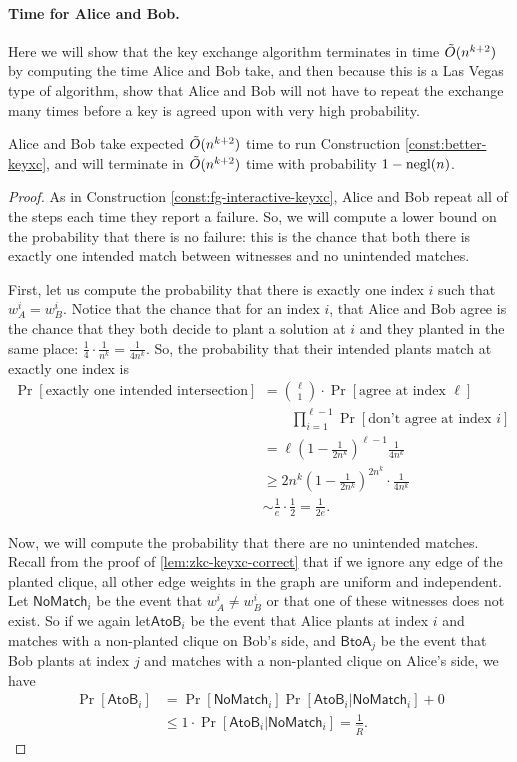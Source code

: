 \paragraph{Time for Alice and Bob.}
Here we will show that the key exchange algorithm terminates in time $\~O(n^{k+2})$ by computing the time Alice and Bob take, and then because this is a Las Vegas type of algorithm, show that Alice and Bob will not have to repeat the exchange many times before a key is agreed upon with very high probability.
\begin{lemma}\label{lem:n2-alice-bob-time}
	Alice and Bob take expected $\~O(n^{k+2})$ time to run Construction \ref{const:better-keyxc}, and will terminate in $\~O(n^{k+2})$ time with probability $1 - \negl(n)$.
\end{lemma}
\begin{proof}
	As in Construction \ref{const:fg-interactive-keyxc}, Alice and Bob repeat all of the steps each time they report a failure. So, we will compute a lower bound on the probability that there is no failure: this is the chance that both there is exactly one intended match between witnesses and no unintended matches.
	
	First, let us compute the probability that there is exactly one index $i$ such that $w_A^i = w_B^i$. Notice that the chance that for an index $i$, that Alice and Bob agree is the chance that they both decide to plant a solution at $i$ and they planted in the same place: $\frac{1}{4} \cdot \frac{1}{n^k} = \frac{1}{4n^k}$. So, the probability that their intended plants match at exactly one index is
	\begin{align*}
	\Pr[\mbox{exactly one intended intersection}] &= \binom \ell 1 \cdot \Pr[\mbox{agree at index } \ell]
	\\&\qquad \prod_{i=1}^{\ell - 1}\Pr[\mbox{don't agree at index }i]\\
	&= \ell \left(1 - \frac 1 {2n^k} \right)^{\ell - 1} \frac{1}{4n^k} \\
	&\ge 2n^k\left(1 - \frac 1 {2n^k} \right)^{2n^k} \cdot \frac 1 {4n^k}\\
	&\sim \frac 1 e \cdot \frac 1 2 = \frac{1}{2e}.
	\end{align*}
	
	Now, we will compute the probability that there are no unintended matches. Recall from the proof of \ref{lem:zkc-keyxc-correct} that if we ignore any edge of the planted clique, all other edge weights in the graph are uniform and independent. Let $\mathsf{NoMatch}_i$ be the event that $w_A^i \neq w_B^i$ or that one of these witnesses does not exist. So if we again let$\mathsf{AtoB}_i$ be the event that Alice plants at index $i$ and matches with a non-planted clique on Bob's side, and $\mathsf{BtoA}_j$ be the event that Bob plants at index $j$ and matches with a non-planted clique on Alice's side, we have
	\begin{align*}
	\Pr[ \mathsf{AtoB}_i] &= \Pr[\mathsf{NoMatch}_i]\Pr[\mathsf{AtoB}_i \vert \mathsf{NoMatch}_i] + 0\\
	&\le 1 \cdot \Pr[\mathsf{AtoB}_i \vert \mathsf{NoMatch}_i] = \frac{1}{\hat R}.
	\end{align*}
	

\end{proof}

